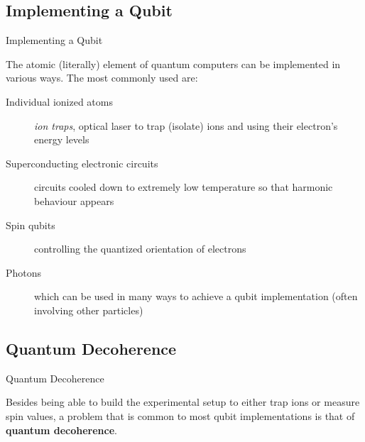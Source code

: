 \documentclass[aspectratio=43]{beamer}
\begin{document}
\subsection{Implementing a Qubit}
\begin{frame}{Implementing a Qubit}
    \begin{cardTiny}
        The atomic (literally) element of quantum computers can be implemented in various ways. The most commonly used are:
        \begin{description}
            \item[Individual ionized atoms] \textit{ion traps}, optical laser to trap (isolate) ions and using their electron's energy levels
            \item [Superconducting electronic circuits] circuits cooled down to extremely low temperature so that harmonic behaviour appears
            \item [Spin qubits] controlling the quantized orientation of electrons
            \item [Photons] which can be used in many ways to achieve a qubit implementation (often involving other particles)
        \end{description}
    \end{cardTiny}
\pagenumber
\end{frame}



\subsection{Quantum Decoherence}
\begin{frame}{Quantum Decoherence}
    \begin{card}
        Besides being able to build the experimental setup to either trap ions or measure spin values, a problem that is common to most qubit implementations is that of \textbf{quantum decoherence}.
    \end{card}
\pagenumber
\end{frame}
\end{document}
